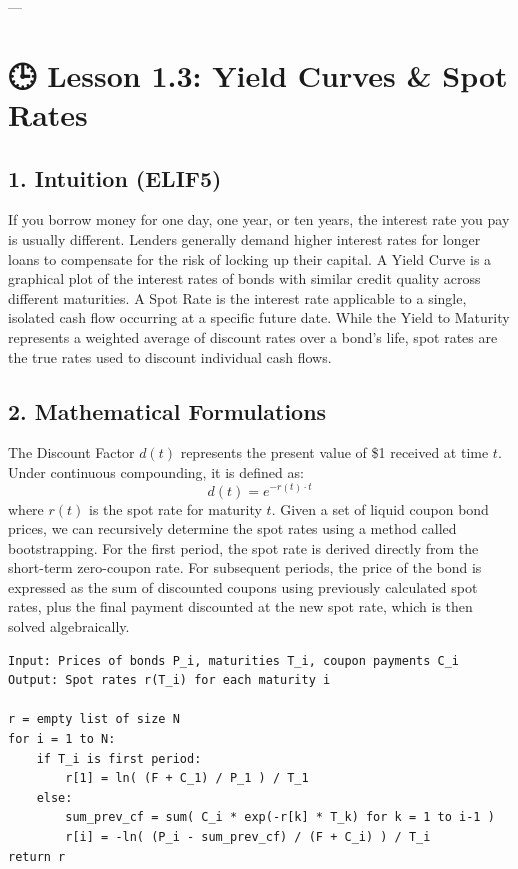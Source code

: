 \documentclass[11pt,oneside]{book}
\begin{document}
---

\section{🕒 Lesson 1.3: Yield Curves \& Spot Rates}

\subsection{1. Intuition (ELIF5)}
If you borrow money for one day, one year, or ten years, the interest rate you pay is usually different. Lenders generally demand higher interest rates for longer loans to compensate for the risk of locking up their capital. A Yield Curve is a graphical plot of the interest rates of bonds with similar credit quality across different maturities. 
A Spot Rate is the interest rate applicable to a single, isolated cash flow occurring at a specific future date. While the Yield to Maturity represents a weighted average of discount rates over a bond's life, spot rates are the true rates used to discount individual cash flows.

\subsection{2. Mathematical Formulations}
The Discount Factor $d(t)$ represents the present value of \$1 received at time $t$. Under continuous compounding, it is defined as:
$$d(t) = e^{-r(t) \cdot t}$$
where $r(t)$ is the spot rate for maturity $t$. Given a set of liquid coupon bond prices, we can recursively determine the spot rates using a method called bootstrapping. For the first period, the spot rate is derived directly from the short-term zero-coupon rate. For subsequent periods, the price of the bond is expressed as the sum of discounted coupons using previously calculated spot rates, plus the final payment discounted at the new spot rate, which is then solved algebraically.

\begin{tcolorbox}[colback=white,colframe=black,boxrule=0.6pt,arc=0mm,title=Spot Rate Bootstrapping]
\begin{verbatim}
Input: Prices of bonds P_i, maturities T_i, coupon payments C_i
Output: Spot rates r(T_i) for each maturity i

r = empty list of size N
for i = 1 to N:
    if T_i is first period:
        r[1] = ln( (F + C_1) / P_1 ) / T_1
    else:
        sum_prev_cf = sum( C_i * exp(-r[k] * T_k) for k = 1 to i-1 )
        r[i] = -ln( (P_i - sum_prev_cf) / (F + C_i) ) / T_i
return r
\end{verbatim}
\end{tcolorbox}
\end{document}
